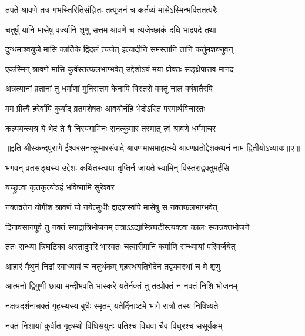 \twolineshloka
{तपते श्रावणे तत्र गभस्तिरितिसंज्ञितः}
{तत्पूजनं च कर्तव्यं मासेऽस्मिन्भक्तितत्परैः} %

\twolineshloka
{चतुर्षु यानि मासेषु वर्ज्यानि शृणु सत्तम}
{श्रावणे च त्यजेच्छाकं दधि भाद्रपदे तथा} %

\twolineshloka
{दुग्धमाश्वयुजे मासि कार्तिके द्विदलं त्यजेत्}
{इत्यादीनि समस्तानि तानि कर्तुमशक्नुवन्} %

\twolineshloka
{एकस्मिन् श्रावणे मासि कुर्वंस्तत्फलभाग्भवेत्}
{उद्देशोऽयं मया प्रोक्तः सङ्क्षेपात्तव मानद} %

\twolineshloka
{अत्रत्यानां व्रतानां तु धर्माणां मुनिसत्तम}
{केनापि विस्तरो वक्तुं नालं वर्षशतैरपि} %

\twolineshloka
{मम प्रीत्यै हरेर्वापि कुर्याद् व्रतमशेषतः}
{आवयोर्नहि भेदोऽस्ति परमार्थविचारतः} %

\twolineshloka
{कल्पयन्त्यत्र ये भेदं ते वै निरयगामिनः}
{सनत्कुमार तस्मात् त्वं श्रावणे धर्ममाचर} %


{॥इति श्रीस्कन्दपुराणे ईश्वरसनत्कुमारसंवादे श्रावणमासमाहात्म्ये श्रावणव्रतोद्देशकथनं नाम द्वितीयोऽध्यायः॥२॥}





\twolineshloka
{भगवन् व्रतसङ्घस्य उद्देशः कथितस्त्वया}
{तृप्तिर्न जायते स्वामिन् विस्तराद्वक्तुमर्हसि} %

\onelineshloka
{यच्छ्रुत्वा कृतकृत्योऽहं भविष्यामि सुरेश्वर} %


\twolineshloka
{नक्तव्रतेन योगीश श्रावणं यो नयेत्सुधीः}
{द्वादशस्वपि मासेषु स नक्तफलभाग्भवेत्} %

\twolineshloka
{दिनावसानपूर्व तु नक्तं स्याद्रात्रिभोजनम्}
{तत्राऽऽद्यास्त्रिघटीस्त्यक्त्वा कालः स्यान्नक्तभोजने} %

\twolineshloka
{ततः सन्ध्या त्रिघटिका अस्तादुपरि भास्वतः}
{चत्वारीमानि कर्माणि सन्ध्यायां परिवर्जयेत्} %

\twolineshloka
{आहारं मैथुनं निद्रां स्वाध्यायं च चतुर्थकम्}
{गृहस्थयतिभेदेन तद्व्यवस्थां च मे शृणु} %

\twolineshloka
{आत्मनो द्विगुणी छाया मन्दीभवति भास्करे}
{यतेर्नक्तं तु तत्प्रोक्तं न नक्तं निशि भोजनम्} %

\twolineshloka
{नक्षत्रदर्शनान्नक्तं गृहस्थस्य बुधैः स्मृतम्}
{यतेर्दिनाष्टमे भागे रात्रौ तस्य निषिध्यते} %

\twolineshloka
{नक्तं निशायां कुर्वीत गृहस्थो विधिसंयुतः}
{यतिश्च विधवा चैव विधुरश्च ससूर्यकम्} %


